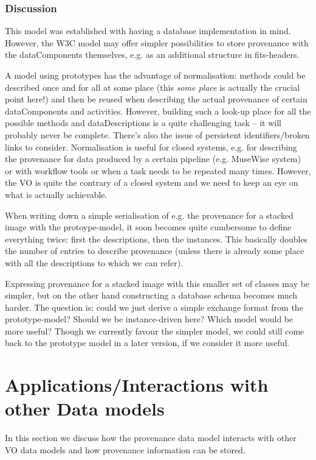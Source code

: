 \documentclass[11pt,a4paper]{ivoa}
\begin{document}
\subsubsection{Discussion}
This model was established with having a database implementation in mind. However, the W3C model may offer simpler possibilities to store provenance with the dataComponents themselves, e.g. as an additional structure in fits-headers.

A model using prototypes has the advantage of normalisation: methods could be described once and for all at some place (this \emph{some place} is actually the crucial point here!) and then be reused when describing the actual provenance of certain dataComponents and activities.
However, building such a look-up place for all the possible methods and dataDescriptions is a quite challenging task -- it will probably never be complete. There's also the issue of persistent identifiers/broken links to consider.
Normalisation is useful for closed systems, e.g. for describing the provenance for data produced by a certain pipeline (e.g. MuseWise system) or with workflow tools or when a task needs to be repeated many times. However, the VO is quite the contrary of a closed system and we need to keep an eye on what is actually achievable.

When writing down a simple serialisation of e.g. the provenance for a stacked image with the protoype-model, it soon becomes quite cumbersome to define everything twice: first the descriptions, then the instances. This basically doubles the number of entries to describe provenance (unless there is already some place with all the descriptions to which we can refer).

Expressing provenance for a stacked image with this smaller set of classes may be simpler, but on the other hand constructing a database schema becomes much harder. 
The question is: could we just derive a simple exchange format from the prototype-model? Should we be instance-driven here? Which model would be more useful?
Though we currently favour the simpler model, we could still come back to the prototype model in a later version, if we consider it more useful.


\section{Applications/Interactions with other Data models}
In this section we discuss how the provenance data model interacts with
other VO data models and how provenance information can be stored.
\end{document}
